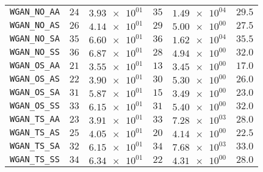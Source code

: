 \begin{xltabular}{\textwidth}{l||CC|CC||C}
	\texttt{WGAN\_NO\_AA} & $ 24$ & $ \num{3.93e+01}$ & $ 35$ & $ \num{1.49e+04}$ &$ 29.5$  \\
	\texttt{WGAN\_NO\_AS} & $ 26$ & $ \num{4.14e+01}$ & $ 29$ & $ \num{5.00e+00}$ &$ 27.5$  \\
	\texttt{WGAN\_NO\_SA} & $ 35$ & $ \num{6.60e+01}$ & $ 36$ & $ \num{1.62e+04}$ &$ 35.5$  \\
	\texttt{WGAN\_NO\_SS} & $ 36$ & $ \num{6.87e+01}$ & $ 28$ & $ \num{4.94e+00}$ &$ 32.0$  \\
	\texttt{WGAN\_OS\_AA} & $ 21$ & $ \num{3.55e+01}$ & $ 13$ & $ \num{3.45e+00}$ &$ 17.0$  \\
	\texttt{WGAN\_OS\_AS} & $ 22$ & $ \num{3.90e+01}$ & $ 30$ & $ \num{5.30e+00}$ &$ 26.0$  \\
	\texttt{WGAN\_OS\_SA} & $ 31$ & $ \num{5.87e+01}$ & $ 15$ & $ \num{3.49e+00}$ &$ 23.0$  \\
	\texttt{WGAN\_OS\_SS} & $ 33$ & $ \num{6.15e+01}$ & $ 31$ & $ \num{5.40e+00}$ &$ 32.0$  \\
	\texttt{WGAN\_TS\_AA} & $ 23$ & $ \num{3.91e+01}$ & $ 33$ & $ \num{7.28e+03}$ &$ 28.0$  \\
	\texttt{WGAN\_TS\_AS} & $ 25$ & $ \num{4.05e+01}$ & $ 20$ & $ \num{4.14e+00}$ &$ 22.5$  \\
	\texttt{WGAN\_TS\_SA} & $ 32$ & $ \num{6.15e+01}$ & $ 34$ & $ \num{7.68e+03}$ &$ 33.0$  \\
	\texttt{WGAN\_TS\_SS} & $ 34$ & $ \num{6.34e+01}$ & $ 22$ & $ \num{4.31e+00}$ &$ 28.0$  \\ \hline

\end{xltabular}
